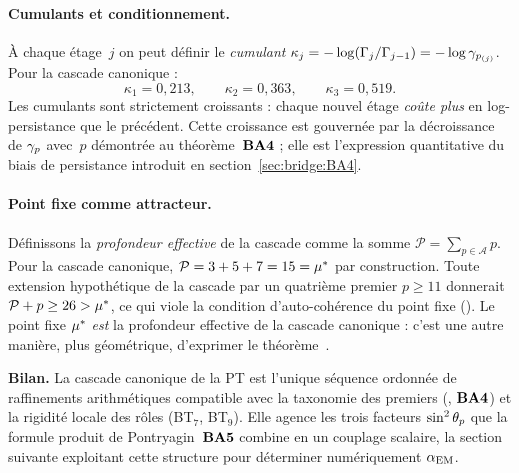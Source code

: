 \paragraph{Cumulants et conditionnement.}
À chaque étage~$j$ on peut définir le \emph{cumulant} $\kappa_j = -\log(\Gamma_j/\Gamma_{j-1}) = -\log \gamma_{p_{(j)}}$. Pour la cascade canonique :
\[
\kappa_1 = 0{,}213, \qquad \kappa_2 = 0{,}363, \qquad \kappa_3 = 0{,}519.
\]
Les cumulants sont strictement croissants : chaque nouvel étage \emph{coûte plus} en log-persistance que le précédent. Cette croissance est gouvernée par la décroissance de $\gamma_{p}$ avec~$p$ démontrée au théorème~$\textbf{BA4}$ ; elle est l'expression quantitative du \og biais de persistance \fg{} introduit en section~\ref{sec:bridge:BA4}.

\paragraph{Point fixe comme attracteur.}
Définissons la \emph{profondeur effective} de la cascade comme la somme $\mathcal P = \sum_{p \in \mathcal A} p$. Pour la cascade canonique, $\mathcal P = 3 + 5 + 7 = 15 = \mu^{*}$ par construction. Toute extension hypothétique de la cascade par un quatrième premier $p \geq 11$ donnerait $\mathcal P + p \geq 26 > \mu^{*}$, ce qui viole la condition d'auto-cohérence du point fixe (\Tfive). Le point fixe $\mu^{*}$ \emph{est} la profondeur effective de la cascade canonique : c'est une autre manière, plus géométrique, d'exprimer le théorème~\Tfive.

\medskip\noindent\textbf{Bilan.} La cascade canonique de la PT est l'unique séquence ordonnée de raffinements arithmétiques compatible avec la taxonomie des premiers (\Tfive, $\textbf{BA4}$) et la rigidité locale des rôles (BT$_7$, BT$_9$). Elle agence les trois facteurs $\sin^2 \theta_{p}$ que la formule produit de Pontryagin~$\textbf{BA5}$ combine en un couplage scalaire, la section suivante exploitant cette structure pour déterminer numériquement $\alpha_{\rm EM}$.
